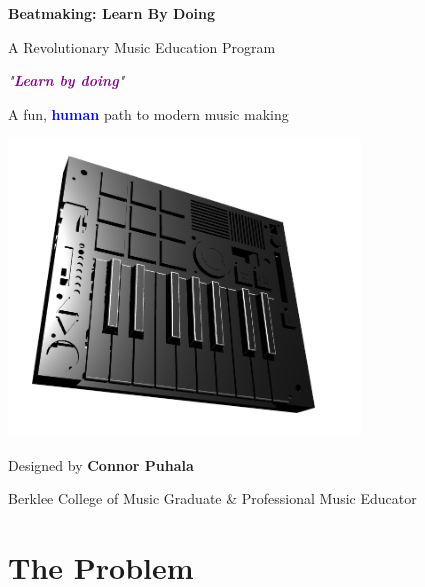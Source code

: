 \documentclass[11pt,letterpaper]{article}
\newcommand{\purple}[1]{\textcolor{purple}{\textbf{#1}}}
\newcommand{\bluepurple}[1]{\textcolor{blue}{\textbf{#1}}}
\begin{document}
\thispagestyle{empty}

\begin{center}
\vspace*{0.5cm}

{\Huge\bfseries\sffamily Beatmaking: Learn By Doing}

\vspace{0.4cm}

{\LARGE A Revolutionary Music Education Program}

\vspace{0.3cm}

{\large\itshape "\purple{Learn by doing}"}

\vspace{0.2cm}

{\large A fun, \bluepurple{human} path to modern music making}

\vspace{1cm}

\includegraphics[width=0.7\textwidth]{beat_machine_3d_render.png}

\vspace{0.8cm}

{\normalsize Designed by \textbf{Connor Puhala}}

{\normalsize Berklee College of Music Graduate \& Professional Music Educator}

\end{center}

\vspace{1.2cm}

\section*{The Problem}
\end{document}
